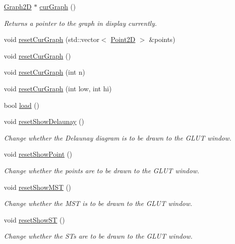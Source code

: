 \begin{DoxyCompactItemize}
\item 
\hyperlink{classcmst_1_1_graph2_d}{Graph2D} $\ast$ \hyperlink{classcmst_1_1_window_a83548b1c4406f37a812a0920fc4d6669}{cur\+Graph} ()
\begin{DoxyCompactList}\small\item\em Returns a pointer to the graph in display currently. \end{DoxyCompactList}\item 
void \hyperlink{classcmst_1_1_window_adfa83ea52f2c09def65b79cdf57092ad}{reset\+Cur\+Graph} (std\+::vector$<$ \hyperlink{classcmst_1_1_point2_d}{Point2D} $>$ \&points)
\item 
void \hyperlink{classcmst_1_1_window_a08365866ac2ffa9793c25c92750341e2}{reset\+Cur\+Graph} ()
\item 
void \hyperlink{classcmst_1_1_window_a83743944c1c6429f0eb9f3c72c9b7f22}{reset\+Cur\+Graph} (int n)
\item 
void \hyperlink{classcmst_1_1_window_aa4ad17303edd88d526b66f9e6918fe7a}{reset\+Cur\+Graph} (int low, int hi)
\item 
bool \hyperlink{classcmst_1_1_window_a3bb28914f7c58f3df9860ce333a8f25f}{load} ()
\item 
void \hyperlink{classcmst_1_1_window_ae54c419d28bd352f52a3beffa6fc1f32}{reset\+Show\+Delaunay} ()
\begin{DoxyCompactList}\small\item\em Change whether the Delaunay diagram is to be drawn to the G\+L\+UT window. \end{DoxyCompactList}\item 
void \hyperlink{classcmst_1_1_window_ade2fbcf37118ec96f9833112c0369d59}{reset\+Show\+Point} ()
\begin{DoxyCompactList}\small\item\em Change whether the points are to be drawn to the G\+L\+UT window. \end{DoxyCompactList}\item 
void \hyperlink{classcmst_1_1_window_aad255fb6e9d56a48f85f9618aa99bc59}{reset\+Show\+M\+ST} ()
\begin{DoxyCompactList}\small\item\em Change whether the M\+ST is to be drawn to the G\+L\+UT window. \end{DoxyCompactList}\item 
void \hyperlink{classcmst_1_1_window_aceb66dae5cf798bf9df5f1f5deca520b}{reset\+Show\+ST} ()
\begin{DoxyCompactList}\small\item\em Change whether the S\+Ts are to be drawn to the G\+L\+UT window. \end{DoxyCompactList}\item 

\end{DoxyCompactItemize}
